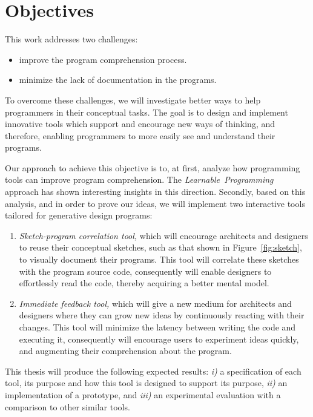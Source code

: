 
% 
% 

\section{Objectives}

This work addresses two challenges:

\begin{itemize}
\item improve the program comprehension process.
\item minimize the lack of documentation in the programs.
\end{itemize}

To overcome these challenges, we will investigate better ways to help programmers in their conceptual tasks. The goal is to design and implement innovative tools which support and encourage new ways of thinking, and therefore, enabling programmers to more easily see and understand their programs.

Our approach to achieve this objective is to, at first, analyze how programming tools can improve program comprehension. The \textit{Learnable~Programming}~\cite{learnableProg,inventingPrin} approach has shown interesting insights in this direction. Secondly, based on this analysis, and in order to prove our ideas, we will implement two interactive tools tailored for generative design programs: 

\begin{enumerate}
\item \textit{Sketch-program correlation tool,} which will encourage architects and designers to reuse their conceptual sketches, such as that shown in Figure~\ref{fig:sketch}, to visually document their programs. This tool will correlate these sketches with the program source code, consequently will enable designers to effortlessly read the code, thereby acquiring a better mental model.

\item \textit{Immediate feedback tool,} which will give a new medium for architects and designers where they can grow new ideas by continuously reacting with their changes. This tool will minimize the latency between writing the code and executing it, consequently will encourage users to experiment ideas quickly, and augmenting their comprehension about the program.
\end{enumerate}

This thesis will produce the following expected results: \textit{i)} a specification of each tool, its purpose and how this tool is designed to support its purpose, \textit{ii)} an implementation of a prototype, and \textit{iii)} an experimental evaluation with a comparison to other similar tools.
